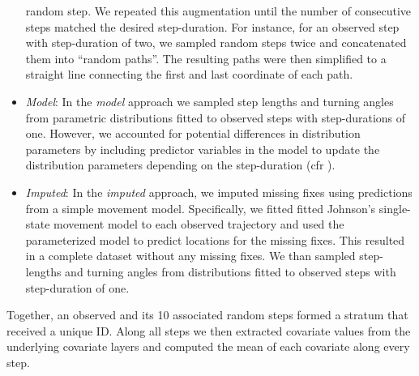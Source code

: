 \documentclass[abstract=on,10pt,a4paper,bibliography=totocnumbered]{article}
\begin{document}
\begin{itemize}
  random step. We repeated this augmentation until the number of consecutive
  steps matched the desired step-duration. For instance, for an observed step
  with step-duration of two, we sampled random steps twice and concatenated them
  into ``random paths''. The resulting paths were then simplified to a straight
  line connecting the first and last coordinate of each path.
  \item \textit{Model}: In the \textit{model} approach we sampled step lengths
  and turning angles from parametric distributions fitted to observed steps with
  step-durations of one. However, we accounted for potential differences in
  distribution parameters by including predictor variables in the model to
  update the distribution parameters depending on the step-duration (cfr
  ).
  \item \textit{Imputed}: In the \textit{imputed} approach, we imputed missing
  fixes using predictions from a simple movement model. Specifically, we fitted
  fitted Johnson's single-state movement model \citep{Johnson.2008} to each
  observed trajectory and used the parameterized model to predict locations for
  the missing fixes. This resulted in a complete dataset without any missing
  fixes. We than sampled step-lengths and turning angles from distributions
  fitted to observed steps with step-duration of one.
\end{itemize}

Together, an observed and its 10 associated random steps formed a stratum that
received a unique ID. Along all steps we then extracted covariate values from
the underlying covariate layers and computed the mean of each covariate along
every step.
\end{document}
